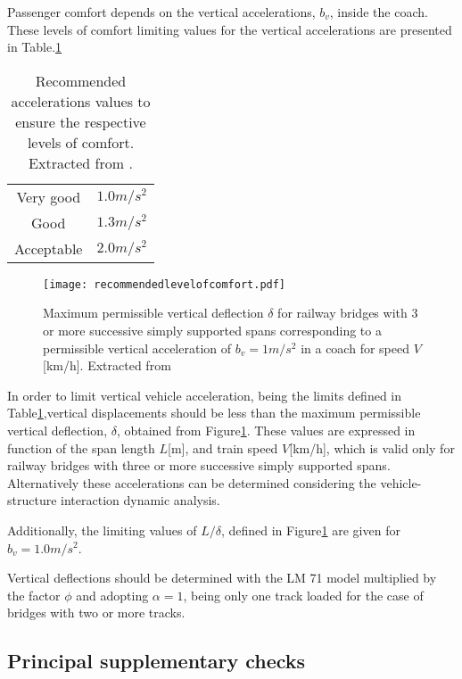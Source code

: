 Passenger comfort depends on the vertical accelerations, $b_v$, inside the coach. These levels of comfort limiting values for the vertical accelerations are presented in Table.\ref{recommendedaccelerationsvalues}

\begin{table}[h]
	\centering
	\begin{tabular}{cc}
		\hline
		Very good & $1.0m/s^2$ \\
		Good & $1.3 m/s^2$ \\
		Acceptable & $2.0m/s^2$\\
		\hline
	\end{tabular}
	\caption{Recommended accelerations values to ensure the respective levels of comfort. Extracted from \cite[Table A 2.9]{1990a2}.}
	\label{recommendedaccelerationsvalues}
\end{table}

\begin{figure}[h]
	\centering
	\texttt{[image: recommendedlevelofcomfort.pdf]}
	\caption{Maximum permissible vertical deflection $\delta$ for railway bridges with 3 or more successive simply supported spans corresponding to a permissible vertical acceleration of $b_v=1m/s^2$ in a coach for speed $V$[km/h]. Extracted from \cite[Figure A2.3]{1990a2}}
	\label{fig:recommendedlevelofcomfort}
\end{figure}

In order to limit vertical vehicle acceleration, being the limits defined in Table\ref{recommendedaccelerationsvalues},vertical displacements should be less than the maximum permissible vertical deflection, $\delta$, obtained from Figure\ref{fig:recommendedlevelofcomfort}. These values are expressed in function of the span length $L$[m], and train speed $V$[km/h], which is valid only for railway bridges with three or more successive simply supported spans. Alternatively these accelerations can be determined considering the vehicle-structure interaction dynamic analysis.

Additionally, the limiting values of $L/\delta$, defined in Figure\ref{fig:recommendedlevelofcomfort} are given for $b_v=1.0m/s^2$.

Vertical deflections should be determined with the LM 71 model multiplied by the factor $\phi$ and adopting $\alpha=1$, being only one track loaded for the case of bridges with two or more tracks.

\subsection{Principal supplementary checks}
